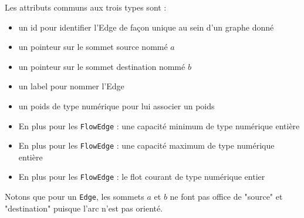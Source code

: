 \documentclass[french]{article}
\begin{document}
			Les attributs communs aux trois types sont :
			\begin{itemize}
				\item un id pour identifier l'Edge de façon unique au sein d'un graphe donné
				\item un pointeur sur le sommet source nommé $a$
				\item un pointeur sur le sommet destination nommé $b$
				\item un label pour nommer l'Edge
				\item un poids de type numérique pour lui associer un poids
				\item En plus pour les \lstinline[basicstyle=\ttfamily\color{blue}]|FlowEdge| : une capacité minimum de type numérique entière
				\item En plus pour les \lstinline[basicstyle=\ttfamily\color{blue}]|FlowEdge| : une capacité maximum de type numérique entière
				\item En plus pour les \lstinline[basicstyle=\ttfamily\color{blue}]|FlowEdge| : le flot courant de type numérique entier\\
			\end{itemize}
			
			Notons que pour un \lstinline[basicstyle=\ttfamily\color{blue}]|Edge|, les sommets $a$ et $b$ ne font pas office de "source" et "destination" puisque l'arc n'est pas orienté.\\
			
\end{document}
